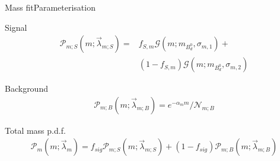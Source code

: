 \documentclass{beamer}
\newcommand{\Bd}{$B_d^0$}
\begin{document}
	\begin{frame}{Mass fit}{Parameterisation}
	\begin{block}{Signal}
	\begin{align}
\nonumber \mathcal{P}_{m;S}(m;\vec{\lambda}_{m;S}) = &f_{S,m}\mathcal{G}(m;m_{\text{\Bd}},\sigma_{m,1}) + \\
&(1-f_{S,m})\mathcal{G}(m;m_{\text{\Bd}},\sigma_{m,2})
\end{align}
\end{block}
\begin{block}{Background}
\begin{align}
\mathcal{P}_{m;B}(m;\vec{\lambda}_{m;B}) = e^{-\alpha_m m}/\mathcal{N}_{m;B}
\end{align}
\end{block}
\begin{block}{Total mass p.d.f.}
\begin{align}
\mathcal{P}_{m}(m;\vec{\lambda}_{m}) = f_{sig}\mathcal{P}_{m;S}(m;\vec{\lambda}_{m;S}) + (1-f_{sig})\mathcal{P}_{m;B}(m;\vec{\lambda}_{m;B})
\end{align}
\end{block}
	\end{frame}
	
\end{document}
